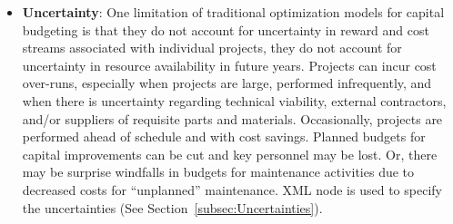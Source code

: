 \begin{itemize}
  \item \textbf{Uncertainty}: One limitation of traditional optimization models for capital
  budgeting is that they do not account for uncertainty in reward and cost streams associated
  with individual projects, they do not account for uncertainty in resource availability in
  future years. Projects can incur cost over-runs, especially when projects are large, performed
  infrequently, and when there is uncertainty regarding technical viability, external contractors,
  and/or suppliers of requisite parts and materials. Occasionally, projects are performed ahead
  of schedule and with cost savings. Planned budgets for capital improvements can be cut and key
  personnel may be lost. Or, there may be surprise windfalls in budgets for maintenance activities
  due to decreased costs for “unplanned” maintenance. XML node  is used
  to specify the uncertainties (See Section~\ref{subsec:Uncertainties}).



\end{itemize}

